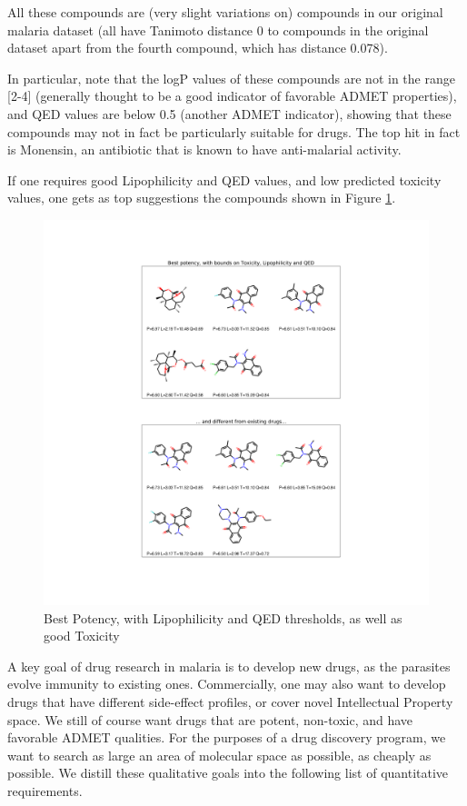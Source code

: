 \documentclass{article}
\begin{document}
All these compounds are (very slight variations on) compounds in our original malaria dataset (all have Tanimoto distance 0 to compounds in the original dataset apart from the fourth compound, which has distance 0.078).  

In particular, note that the logP values of these compounds are not in the range [2-4] (generally thought to be a good indicator of favorable ADMET properties), and QED values are below 0.5 (another ADMET indicator), showing that these compounds may not in fact be particularly suitable for drugs.  The top hit in fact is Monensin, an antibiotic that is known to have anti-malarial activity\cite{Ludwig2019}.

If one requires good Lipophilicity and QED values, and low predicted toxicity values, one gets as top suggestions the compounds shown in Figure \ref{fig:best_q}.


\begin{figure}[h!]
\centering
\includegraphics[width=\textwidth]{fig7.png}
\caption{Best Potency, with Lipophilicity and QED thresholds, as well as good Toxicity}
\label{fig:best_q}
\end{figure}


A key goal of drug research in malaria is to develop new drugs, as the parasites evolve immunity to existing ones.  Commercially, one may also want to develop drugs that have different side-effect profiles, or cover novel Intellectual Property space.  We still of course want drugs that are potent, non-toxic, and have favorable ADMET qualities.  For the purposes of a drug discovery program, we want to search as large an area of molecular space as possible, as cheaply as possible.  We distill these qualitative goals into the following list of quantitative requirements. 
\end{document}
